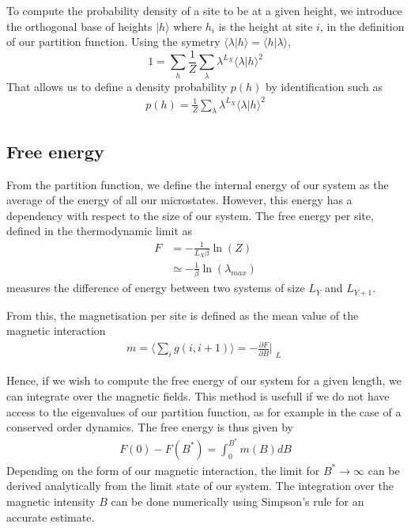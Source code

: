 To compute the probability density of a site to be at a given height, we introduce the orthogonal base of heights $|h\rangle$ where $h_i$ is the height at site $i$, in the definition of our partition function. Using the symetry $\langle\lambda|h\rangle = \langle h|\lambda\rangle$,
\[ 1 = \sum_h \frac{1}{Z} \sum_\lambda \lambda^{L_X} \langle\lambda | h \rangle^2 \]
That allows us to define a density probability $p(h)$ by identification such as 
\begin{align}
  p(h) = \frac{1}{Z} \sum_\lambda \lambda^{L_X} \langle\lambda | h \rangle^2 
  \label{density}
\end{align}

\subsection{Free energy}

From the partition function, we define the internal energy of our system as the average of the energy of all our microstates. However, this energy has a dependency with respect to the size of our system. The free energy per site, defined in the thermodynamic limit as 
\begin{align} 
  F &=  - \frac{1}{L_X \beta} \ln(Z) \\
    &\simeq - \frac{1}{\beta } \ln( \lambda_{max})
  \label{deffree_energy}    
\end{align}
measures the difference of energy between two systems of size $L_Y$ and $L_{Y+1}$.

From this, the magnetisation per site is defined as the mean value of the magnetic interaction 
\begin{align}
  m = \langle \sum_{i} g(i,i+1) \rangle = -\frac{\partial F}{\partial B} \Bigr|_{\substack{L}}
\end{align}

Hence, if we wish to compute the free energy of our system for a given length, we can integrate over the magnetic fields. This method is usefull if we do not have access to the eigenvalues of our partition function, as for example in the case of a conserved order dynamics. The free energy is thus given by
\begin{align}
  F(0) - F(B^\ast) = \int_0^{B^\ast} m(B) dB
  \label{free_energy}
\end{align}
Depending on the form of our magnetic interaction, the limit for $B^\ast \rightarrow \infty$ can be derived analytically from the limit state of our system. The integration over the magnetic intensity $B$ can be done numerically using Simpson's rule for an accurate estimate. 

